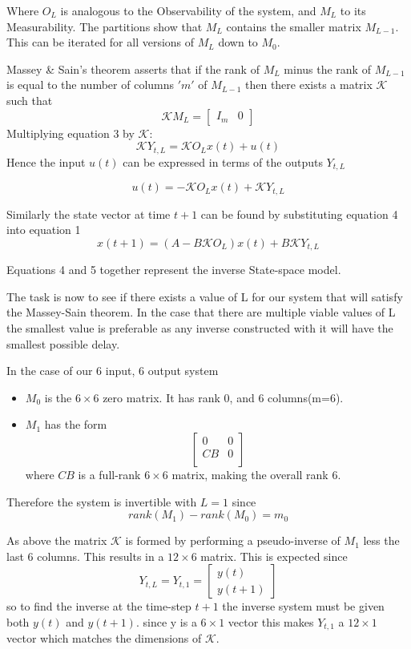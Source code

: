 \documentclass{report}
\begin{document}
Where $O_L$ is analogous to the Observability of the system, and $M_L$ to its Measurability. The partitions show that $M_L$ contains the smaller matrix $M_{L-1}$. This can be iterated for all versions of $M_L$ down to $M_0$.

Massey \& Sain's theorem asserts that if the rank of $M_L$ minus the rank of $M_{L-1}$ is equal to the number of columns $'m'$ of $M_{L-1}$ then there exists a matrix $\mathcal{K}$ such that
\[
\mathcal{K}M_L =
\left[
\begin{array}{c|c}
I_m & 0
\end{array}
\right]
\]
Multiplying equation 3 by $\mathcal{K}$:
\[
\mathcal{K}Y_{t,L} = \mathcal{K}O_Lx(t) + u(t)
\]
Hence the input $u(t)$ can be expressed in terms of the outputs $Y_{t,L}$

\begin{equation}
u(t) = -\mathcal{K}O_Lx(t) + \mathcal{K}Y_{t,L}
\end{equation}

Similarly the state vector at time $t+1$ can be found by substituting equation 4 into equation 1
\begin{equation}
x(t+1) = (A-B\mathcal{K}O_L)x(t) + B\mathcal{K}Y_{t,L}
\end{equation}

Equations 4 and 5 together represent the inverse State-space model.

The task is now to see if there exists a value of L for our system that will satisfy the Massey-Sain theorem. In the case that there are multiple viable values of L the smallest value is preferable as any inverse constructed with it will have the smallest possible delay.

In the case of our 6 input, 6 output system
\begin{itemize}
\item{$M_0$ is the $6\times6$ zero matrix. It has rank 0, and 6 columns(m=6).
}
\item{$M_1$ has the form
\[
\left[
\begin{array}{cc}
0	&	0	\\
CB	&	0	\\
\end{array}
\right]
\]
where $CB$ is a full-rank $6\times6$ matrix, making the overall rank 6.
}
\end{itemize}

Therefore the system is invertible with $L=1$ since
\[
rank(M_1) - rank(M_0) = m_0
\]

As above the matrix $\mathcal{K}$ is formed by performing a pseudo-inverse of $M_1$ less the last 6 columns. This results in a $12\times6$ matrix. This is expected since
\[
Y_{t,L} = Y_{t,1} =
\begin{bmatrix}
y(t)	\\
y(t+1)
\end{bmatrix}
\]
so to find the inverse at the time-step $t+1$ the inverse system must be given both $y(t)$ and $y(t+1)$. since y is a $6\times1$ vector this makes $Y_{t,1}$ a $12\times1$ vector which matches the dimensions of $\mathcal{K}$.
\end{document}
